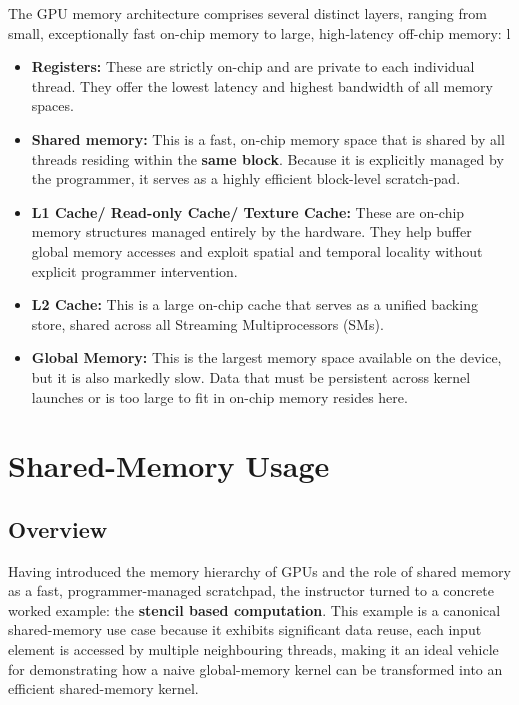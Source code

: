 The GPU memory architecture comprises several distinct layers, ranging from small, exceptionally fast on-chip memory to large, high-latency off-chip memory:
l
\begin{itemize}
    \item \textbf{Registers:} These are strictly on-chip and are private to each individual thread. They offer the lowest latency and highest bandwidth of all memory spaces.
    
    \item \textbf{Shared memory:} This is a fast, on-chip memory space that is shared by all threads residing within the \textbf{same block}. Because it is explicitly managed by the programmer, it serves as a highly efficient block-level scratch-pad.
    
    \item \textbf{L1 Cache/ Read-only Cache/ Texture Cache:} These are on-chip memory structures managed entirely by the hardware. They help buffer global memory accesses and exploit spatial and temporal locality without explicit programmer intervention.
    
    \item \textbf{L2 Cache:} This is a large on-chip cache that serves as a unified backing store, shared across all Streaming Multiprocessors (SMs).
    
    \item \textbf{Global Memory:} This is the largest memory space available on the device, but it is also markedly slow. Data that must be persistent across kernel launches or is too large to fit in on-chip memory resides here.
\end{itemize}
\newpage
\section{Shared-Memory Usage}


\subsection{Overview}
 
Having introduced the memory hierarchy of GPUs and the role of shared memory
as a fast, programmer-managed scratchpad, the instructor turned to a concrete
worked example: the \textbf{stencil based computation}. This example is a
canonical shared-memory use case because it exhibits significant data reuse,
each input element is accessed by multiple neighbouring threads, making it
an ideal vehicle for demonstrating how a naive global-memory kernel can be
transformed into an efficient shared-memory kernel.
 
